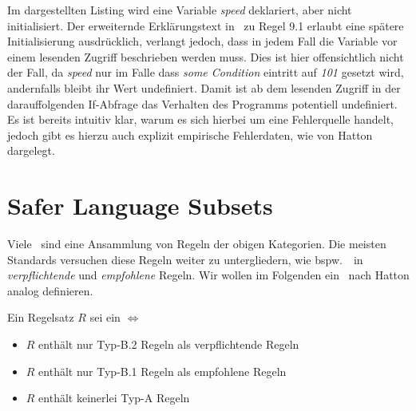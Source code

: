 \documentclass[a4paper,UKenglish,cleveref, autoref]{templates/lipics-v2019}
\begin{document}
    \noindent
    \begin{minipage}{\linewidth}
        \begin{example}
            
        \end{example}
    \end{minipage}

    Im dargestellten Listing wird eine Variable \textit{speed} deklariert, aber nicht initialisiert.
    Der erweiternde Erklärungstext in~\cite{MISRA2004} zu Regel 9.1 erlaubt eine spätere Initialisierung ausdrücklich, verlangt jedoch, dass
    in jedem Fall die Variable vor einem lesenden Zugriff beschrieben werden muss.
    Dies ist hier offensichtlich nicht der Fall, da \textit{speed} nur im Falle dass \textit{some Condition} eintritt auf
    \textit{101} gesetzt wird, andernfalls bleibt ihr Wert undefiniert.
    Damit ist ab dem lesenden Zugriff in der darauffolgenden If-Abfrage das Verhalten des Programms potentiell undefiniert.
    Es ist bereits intuitiv klar, warum es sich hierbei um eine Fehlerquelle handelt, jedoch gibt es hierzu auch explizit
    empirische Fehlerdaten, wie von Hatton dargelegt.\cite{hatton2004safer}

    \section{Safer Language Subsets}
    \label{sec:safer-language-subsets}

    Viele \sqss\ sind eine Ansammlung von Regeln der obigen Kategorien.
    Die meisten Standards versuchen diese Regeln weiter zu untergliedern, wie bspw.\ \misra\ in \textit{verpflichtende}
    und \textit{empfohlene} Regeln.
    Wir wollen im Folgenden ein \sls\ nach Hatton analog definieren.

    \begin{definition}
        Ein Regelsatz $R$ sei ein \sls $\iff$
        \begin{itemize}
            \item $R$ enthält nur Typ-B.2 Regeln als verpflichtende Regeln
            \item $R$ enthält nur Typ-B.1 Regeln als empfohlene Regeln
            \item $R$ enthält keinerlei Typ-A Regeln
        \end{itemize}
    \end{definition}
\end{document}
